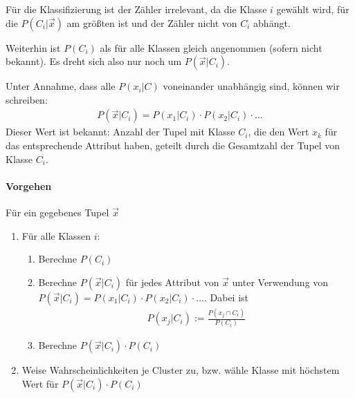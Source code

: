 \documentclass[10pt]{article} %
\begin{document}
   Für die Klassifizierung ist der Zähler irrelevant, da die Klasse $i$ gewählt wird, für die $P(C_i|\vec{x})$ am größten ist und der Zähler nicht von $C_i$ abhängt.

   Weiterhin ist $P(C_i)$ als für alle Klassen gleich angenommen (sofern nicht bekannt). Es dreht sich also nur noch um $P(\vec{x}|C_i)$.

   Unter Annahme, dass alle $P(x_i | C)$ voneinander unabhängig sind, können wir schreiben:
   \begin{align*} 
       P(\vec{x}|C_i) = P(x_1|C_i) \cdot P(x_2|C_i) \cdot ... 
   \end{align*} 
   Dieser Wert ist bekannt: Anzahl der Tupel mit Klasse $C_i$, die den Wert $x_k$ für das entsprechende Attribut haben, geteilt durch die Gesamtzahl der Tupel von Klasse $C_i$.


\paragraph{Vorgehen} Für ein gegebenes Tupel $\vec{x}$
\begin{enumerate} 
   \item Für alle Klassen $i$: 
   \begin{enumerate} 
      \item Berechne $P(C_i)$ 
      \item Berechne $P(\vec{x}|C_i)$ für jedes Attribut von $\vec{x}$ unter
        Verwendung von $P(\vec{x}|C_i) = P(x_1|C_i) \cdot P(x_2|C_i) \cdot ...
        $. Dabei ist
        \begin{align*}
          P(x_j|C_i) := \frac{P(x_j \cap C_i)}{P(C_i)} 
        \end{align*}
      \item Berechne $P(\vec{x}|C_i) \cdot P(C_i)$
    \end{enumerate}
   \item Weise Wahrscheinlichkeiten je Cluster zu, bzw. wähle Klasse mit höchstem Wert für $P(\vec{x}|C_i) \cdot P(C_i)$
\end{enumerate} 
\end{document}
